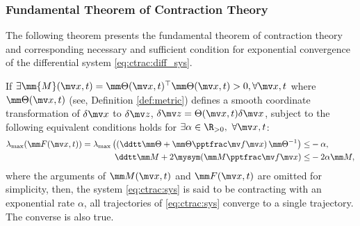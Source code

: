 \subsubsection{Fundamental Theorem of Contraction Theory}

The following theorem presents the fundamental theorem of contraction theory and corresponding necessary and sufficient condition for exponential convergence of the differential system \eqref{eq:ctrac:diff_sys}.

\begin{theorem}
    If $
        \exists \mm{M}(\bdx,t)
        =
        \mm\Theta(\bdx,t)^\top
        \mm\Theta(\bdx,t)
        > 0, \forall \bdx,t
    $ where $\mm\Theta(\bdx,t)$ (see, Definition \ref{def:metric}) defines a smooth coordinate transformation of $\delta\bdx$ to $\delta\bdz$, \ie $\delta\bdz = \Theta(\bdx,t)\delta\bdx$, subject to the following equivalent conditions holds for $\exists\alpha\in\R_{>0},\ \forall \bdx,t$:
    \begin{subequations}
        \begin{align}
            \lambda_{\max} (
                \mm F(\bdx,t)
            )
            =
            \lambda_{\max} 
            \left(
                \left(    
                \ddtt \mm\Theta
                +
                \mm\Theta\tpfpx
                \right)
                \mm\Theta^{-1}
            \right)
            \le&
            -\alpha
            ,
        \label{eq:ctrac:ctrac:metric:F}
            \\
            \ddtt \mm M
            +
            2\mysym(\mm M\tpfpx)
            \le&
            -2\alpha\mm M
            ,
        \label{eq:ctrac:ctrac:metric:M}
        \end{align}
        \label{eq:ctrac:ctrac:metric}
    \end{subequations}
    where the arguments of $\mm M(\bdx,t)$ and $\mm F(\bdx,t)$ are omitted for simplicity, then, the system \eqref{eq:ctrac:sys} is said to be contracting with an exponential rate $\alpha$, \ie all trajectories of \eqref{eq:ctrac:sys} converge to a single trajectory.
    The converse is also true.
    \label{thm:ctrac:main}
\end{theorem}

